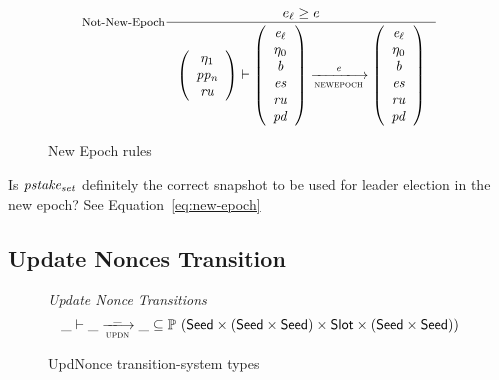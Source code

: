 \begin{figure}[ht]
  \nextdef

  \begin{equation}\label{eq:not-new-epoch}
    \inference[Not-New-Epoch]
    {
      e_\ell \geq e
    }
    {
      \left(
        {\begin{array}{c}
            \eta_1 \\
            \var{pp_n} \\
            \var{ru} \\
        \end{array}}
      \right)
      \vdash
      {\left(\begin{array}{c}
            \var{e_\ell} \\
            \eta_0 \\
            \var{b} \\
            \var{es} \\
            \var{ru} \\
            \var{pd} \\
      \end{array}\right)}
      \trans{newepoch}{\var{e}}
      {\left(\begin{array}{c}
            \var{e_\ell} \\
            \eta_0 \\
            \var{b} \\
            \var{es} \\
            \var{ru} \\
            \var{pd} \\
      \end{array}\right)}
    }
  \end{equation}
  \caption{New Epoch rules}
  \label{fig:rules:not-new-epoch}
\end{figure}

\begin{question}
  Is $\mathit{pstake_{set}}$ definitely the correct snapshot to be
  used for leader election in the new epoch?
  See Equation~\ref{eq:new-epoch}
\end{question}

\subsection{Update Nonces Transition}
\label{sec:update-nonces-trans}

\begin{figure}
  \emph{Update Nonce Transitions}
  \begin{equation*}
    \_ \vdash \var{\_} \trans{updn}{\_} \var{\_} \subseteq
    \powerset (\Seed \times (\Seed\times\Seed) \times \Slot \times (\Seed\times\Seed))
  \end{equation*}
  \caption{UpdNonce transition-system types}
  \label{fig:ts-types:updnonce}
\end{figure}

